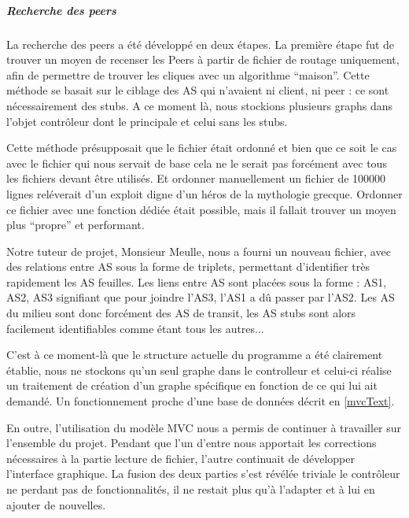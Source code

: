 \subparagraph{Recherche des peers\\}
La recherche des peers a été développé en deux étapes. La première étape fut de trouver un moyen de recenser les Peers à partir de fichier de routage uniquement, afin de permettre de trouver les cliques avec un algorithme ``maison''. Cette méthode se basait sur le ciblage des AS qui n'avaient ni client, ni peer : ce sont n\'ecessairement des stubs. A ce moment là, nous stockions plusieurs graphs dans l'objet contrôleur dont le principale et celui sans les stubs.

Cette méthode présupposait que le fichier était ordonné et bien que ce soit le cas avec le fichier qui nous servait de base cela ne le serait pas forcément avec tous les fichiers devant être utilisés. Et ordonner manuellement un fichier de 100000 lignes reléverait d'un exploit digne d'un héros de la mythologie grecque. Ordonner ce fichier avec une fonction dédiée était possible, mais il fallait trouver un moyen plus ``propre'' et performant.

\par Notre tuteur de projet, Monsieur Meulle, nous a fourni un nouveau fichier, avec des relations entre AS sous la forme de triplets, permettant d'identifier tr\`es rapidement les AS feuilles.
Les liens entre AS sont plac\'ees sous la forme : {AS1, AS2, AS3} signifiant que pour joindre l'AS3, l'AS1 a dû passer par l'AS2. Les AS du milieu sont donc forcément des AS de transit, les AS stubs sont alors facilement identifiables comme \'etant tous les autres... 

C'est à ce moment-là que le structure actuelle du programme a été clairement établie, nous ne stockons qu'un seul graphe dans le controlleur et celui-ci réalise un traitement de création d'un graphe spécifique en fonction de ce qui lui ait demandé. Un fonctionnement proche d'une base de données décrit en \ref{mvcText}. 

En outre, l'utilisation du modèle MVC nous a permis de continuer à travailler sur l'ensemble du projet. Pendant que l'un d'entre nous apportait les corrections nécessaires à la partie lecture de fichier, l'autre continuait de développer l'interface graphique. La fusion des deux parties s'est révélée triviale le contrôleur ne perdant pas de fonctionnalités, il ne restait plus qu'à l'adapter et à lui en ajouter de nouvelles.
